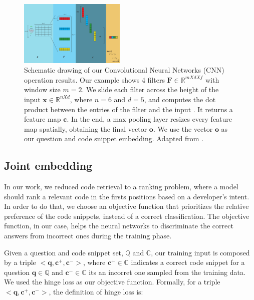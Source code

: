 \documentclass[sigconf]{acmart}
\begin{document}
\begin{figure}[H]
    \centering
    \includegraphics[width=0.45\textwidth]{figuras/cnn-steps-word-embedding-article.pdf}
    \caption{Schematic drawing of our Convolutional Neural Networks (CNN) operation results. Our example shows 4 filters $\bm{F} \in \mathbb{R}^{m X d X f}$ with window size $m = 2$. We slide each filter across the height of the input $\bm{x} \in \mathbb{R}^{n X d}$, where $n = 6$ and $d = 5$, and computes the dot product between the entries of the filter and the input \cite{karpathy-course-cnn-2016}. It returns a feature map $\bm{c}$. In the end, a max pooling layer resizes every feature map spatially, obtaining the final vector $\bm{o}$. We use the vector $\bm{o}$ as our question and code snippet embedding. Adapted from \cite{zhang-guide-convolutional-cnn-embedding-ilustration:2015}.}
    \label{fig:cnn-steps-word-embedding}
\end{figure}

\subsection{Joint embedding}
\label{sec:joint-embedding}

In our work, we reduced code retrieval to a ranking problem, where a model should rank a relevant code in the firsts positions based on a developer's intent. In order to do that, we choose an objective function that prioritizes the relative preference of the code snippets, instead of a correct classification. The objective function, in our case, helps the neural networks to discriminate the correct answers from incorrect ones during the training phase.


Given a question and code snippet set, $\mathbb{Q}$ and $\mathbb{C}$, our training input is composed by a triple $<\bm{q}, \bm{c^{+}}, \bm{c^{-}}>$, where $\bm{c^{+}} \in \mathbb{C}$ indicates a correct code snippet for a question $\bm{q} \in \mathbb{Q}$ and $\bm{c^{-}} \in \mathbb{C}$ its an incorret one sampled from the training data. We used the hinge loss as our objective function. Formally, for a triple $<\bm{q}, \bm{c^{+}}, \bm{c^{-}}>$, the definition of hinge loss is:
\end{document}
